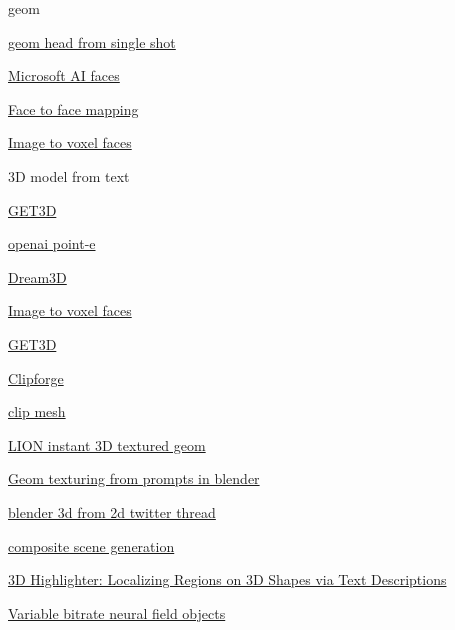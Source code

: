      
      geom

       
      \tightlist
       
        \href{https://samsunglabs.github.io/rome/}{geom head from single
        shot}
       
        \href{https://www.youtube.com/watch?v=uboj01Gfy1A}{Microsoft AI
        faces}
       
        \href{https://replicate.com/yoyo-nb/thin-plate-spline-motion-model}{Face
        to face mapping}
       
        \href{https://katjaschwarz.github.io/voxgraf/}{Image to voxel
        faces}
       
        3D model from text

         
        \tightlist
         
          \href{https://nv-tlabs.github.io/GET3D/}{GET3D}
         
          \href{https://github.com/openai/point-e}{openai point-e}
         
          \href{https://ajayj.com/dreamfields}{Dream3D}
         
       
        \href{https://katjaschwarz.github.io/voxgraf/}{Image to voxel
        faces}
       
        \href{https://nv-tlabs.github.io/GET3D/}{GET3D}
       
        \href{https://github.com/autodeskailab/clip-forge}{Clipforge}
       
        \href{https://paperswithcode.com/paper/text-to-mesh-without-3d-supervision-using}{clip
        mesh}
       
        \href{https://nv-tlabs.github.io/LION/}{LION instant 3D textured
        geom}
       
        \href{https://github.com/carson-katri/dream-textures/pull/409}{Geom
        texturing from prompts in blender}
       
        \href{https://twitter.com/TomLikesRobots/status/1603884188326940674}{blender
        3d from 2d twitter thread}
       
        \href{https://github.com/zoomin-lee/scene-scale-diffusion}{composite
        scene generation}
       
        \href{https://threedle.github.io/3DHighlighter/}{3D Highlighter:
        Localizing Regions on 3D Shapes via Text Descriptions}
       
        \href{https://nv-tlabs.github.io/vqad/}{Variable bitrate neural
        field objects}
       
